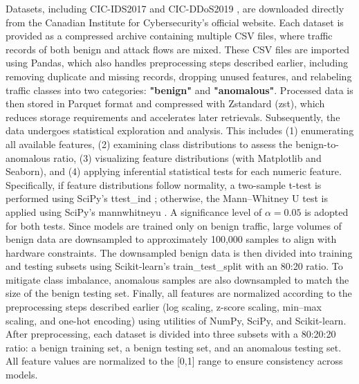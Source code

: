 Datasets, including CIC-IDS2017 \citep{cicids2017} and CIC-DDoS2019 \citep{cicddos2019}, are downloaded directly from the Canadian Institute for Cybersecurity's official website. Each dataset is provided as a compressed archive containing multiple CSV files, where traffic records of both benign and attack flows are mixed. These CSV files are imported using Pandas, which also handles preprocessing steps described earlier, including removing duplicate and missing records, dropping unused features, and relabeling traffic classes into two categories: \textbf{"benign"} and \textbf{"anomalous"}. Processed data is then stored in Parquet format and compressed with Zstandard (zst), which reduces storage requirements and accelerates later retrievals. Subsequently, the data undergoes statistical exploration and analysis. This includes (1) enumerating all available features, (2) examining class distributions to assess the benign-to-anomalous ratio, (3) visualizing feature distributions (with Matplotlib and Seaborn), and (4) applying inferential statistical tests for each numeric feature. Specifically, if feature distributions follow normality, a two-sample t-test is performed using SciPy’s ttest\_ind \citep{scipytt}; otherwise, the Mann–Whitney U test is applied using SciPy’s mannwhitneyu \citep{scipymt}. A significance level of $\alpha = 0.05$ is adopted for both tests. Since models are trained only on benign traffic, large volumes of benign data are downsampled to approximately 100,000 samples to align with hardware constraints. The downsampled benign data is then divided into training and testing subsets using Scikit-learn's train\_test\_split \citep{sklearntts} with an 80:20 ratio. To mitigate class imbalance, anomalous samples are also downsampled to match the size of the benign testing set. Finally, all features are normalized according to the preprocessing steps described earlier (log scaling, z-score scaling, min–max scaling, and one-hot encoding) using utilities of NumPy, SciPy, and Scikit-learn. After preprocessing, each dataset is divided into three subsets with a 80:20:20 ratio: a benign training set, a benign testing set, and an anomalous testing set. All feature values are normalized to the [0,1] range to ensure consistency across models.

